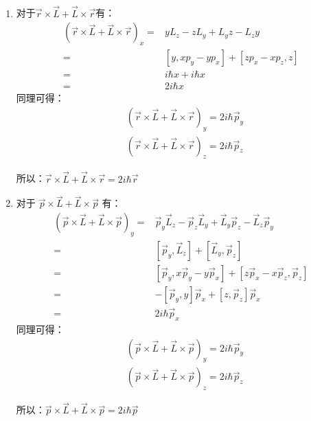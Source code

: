 \subsection{ }
\begin{enumerate}
\item 对于$\vec{r} \times \vec{L} + \vec{L} \times \vec{r} $有：
\begin{equation}
\begin{aligned}
(\vec{r} \times \vec{L} + \vec{L} \times \vec{r})_{x} =& yL_{z}-zL_{y}+L_{y}z-L_{z}y \\
=& [y,xp_{y}-yp_{x}]+[zp_{x}-xp_{z},z] \\
=& i\hbar x + i\hbar x \\
=&2i\hbar x
\end{aligned}
\end{equation}
同理可得：\\
\begin{equation}
\begin{aligned}
& (\vec{r} \times \vec{L} + \vec{L} \times \vec{r})_{y} =2i\hbar \vec{p}_{y} \\
& (\vec{r} \times \vec{L} + \vec{L} \times \vec{r})_{z} =2i\hbar \vec{p}_{z}
\end{aligned}
\end{equation}

所以：$\vec{r} \times \vec{L} + \vec{L} \times \vec{r} = 2i\hbar \vec{r} $
\item 对于 $\vec{p} \times \vec{L} + \vec{L} \times \vec{p}$ 有：
\begin{equation}
\begin{aligned}
(\vec{p} \times \vec{L} + \vec{L} \times \vec{p})_{y} =& \vec{p}_{y} \vec{L}_{z} - \vec{p}_{z} \vec{L}_{y} + \vec{L}_{y} \vec{p}_{z} - \vec{L}_{z} \vec{p}_{y} \\
=& [\vec{p}_{y},\vec{L}_{z}] + [\vec{L}_{y},\vec{p}_{z}] \\
=& [\vec{p}_{y},x\vec{p}_{y} - y\vec{p}_{x}] + [z\vec{p}_{x}-x\vec{p}_{z},\vec{p}_{z}] \\
=& -[\vec{p}_{y},y]\vec{p}_{x} + [z,\vec{p}_{z}]\vec{p}_{x} \\
=& 2i\hbar \vec{p}_{x}
\end{aligned}
\end{equation}
同理可得：\\
\begin{equation}
\begin{aligned}
& (\vec{p} \times \vec{L} + \vec{L} \times \vec{p})_{y} =2i\hbar \vec{p}_{y} \\
& (\vec{p} \times \vec{L} + \vec{L} \times \vec{p})_{z} =2i\hbar \vec{p}_{z}
\end{aligned}
\end{equation}

所以：$\vec{p} \times \vec{L} + \vec{L} \times \vec{p} = 2i\hbar \vec{p} $
\end{enumerate}

